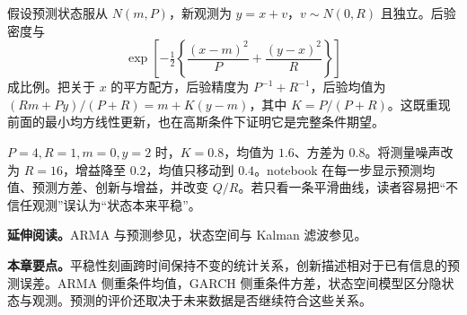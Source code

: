 假设预测状态服从 $N(m,P)$，新观测为 $y=x+v$，$v\sim N(0,R)$ 且独立。后验密度与
\[
 \exp\left[-\tfrac12\left\{\frac{(x-m)^2}{P}+\frac{(y-x)^2}{R}\right\}\right]
\]
成比例。把关于 $x$ 的平方配方，后验精度为 $P^{-1}+R^{-1}$，后验均值为 $(R m+P y)/(P+R)=m+K(y-m)$，其中 $K=P/(P+R)$。这既重现前面的最小均方线性更新，也在高斯条件下证明它是完整条件期望。

$P=4,R=1,m=0,y=2$ 时，$K=0.8$，均值为 $1.6$、方差为 $0.8$。将测量噪声改为 $R=16$，增益降至 $0.2$，均值只移动到 $0.4$。notebook 在每一步显示预测均值、预测方差、创新与增益，并改变 $Q/R$。若只看一条平滑曲线，读者容易把“不信任观测”误认为“状态本来平稳”。

\noindent\textbf{延伸阅读。}ARMA 与预测参见\cite{brockwell2016timeseries}，状态空间与 Kalman 滤波参见\cite{harvey1990structural}。




\noindent\textbf{本章要点。}平稳性刻画跨时间保持不变的统计关系，创新描述相对于已有信息的预测误差。ARMA 侧重条件均值，GARCH 侧重条件方差，状态空间模型区分隐状态与观测。预测的评价还取决于未来数据是否继续符合这些关系。